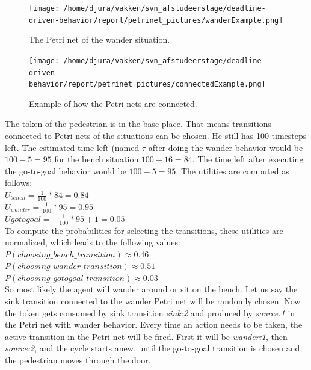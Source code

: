 \documentclass[11pt, a4paper]{book}
\begin{document}
\begin{figure}[h!]
\centering            
\texttt{[image: /home/djura/vakken/svn\_afstudeerstage/deadline-driven-behavior/report/petrinet\_pictures/wanderExample.png]}
\caption{The Petri net of the wander situation.}
\label{fig:wanderSituationNet}
\end{figure}

\begin{figure}[h!]
\centering            
\texttt{[image: /home/djura/vakken/svn\_afstudeerstage/deadline-driven-behavior/report/petrinet\_pictures/connectedExample.png]}
\caption{Example of how the Petri nets are connected.}
\label{fig:connectedExample}
\end{figure}

The token of the pedestrian is in the base place. That means transitions connected to Petri nets of the situations can be chosen. He still has 100 timesteps left. The estimated time left (named $\tau$ after doing the wander behavior would be $100 - 5=95$ for the bench situation $100-16=84$. The time left after executing the go-to-goal behavior would be $100-5=95$. The utilities are computed as follows:\\
$U_{bench}=\frac{1}{100} * 84 = 0.84$  \\
$U_{wander}=\frac{1}{100} * 95=0.95 $\\
$U{gotogoal}=-\frac{1}{100} * 95 + 1 =0.05$\\

To compute the probabilities for selecting the transitions, these utilities are normalized, which leads to the following values:\\
$P(choosing\_bench\_transition)\approx 0.46$\\
$P(choosing\_wander\_transition)\approx 0.51$\\
$P(choosing\_gotogoal\_transition)\approx 0.03$\\
So most likely the agent will wander around or sit on the bench. Let us say the sink transition connected to the wander Petri net will be randomly chosen. Now the token gets consumed by sink transition \emph{sink:2} and produced by \emph{source:1} in the Petri net with wander behavior. Every time an action needs to be taken, the active transition in the Petri net will be fired. First it will be \emph{wander:1}, then \emph{source:2}, and the cycle starts anew, until the go-to-goal transition is chosen and the pedestrian moves through the door.
\end{document}
